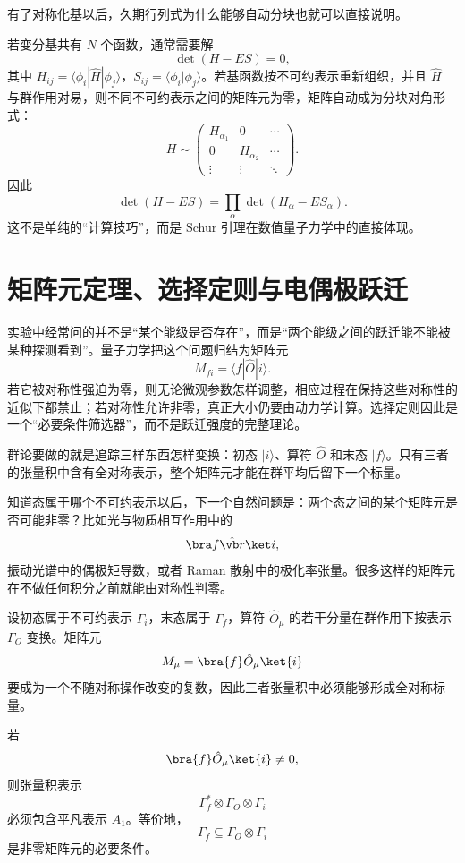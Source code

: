 有了对称化基以后，久期行列式为什么能够自动分块也就可以直接说明。

若变分基共有 $N$ 个函数，通常需要解
\[
\det(H-ES)=0,
\]
其中 $H_{ij}=\langle\phi_i|\hat H|\phi_j\rangle$，$S_{ij}=\langle\phi_i|\phi_j\rangle$。若基函数按不可约表示重新组织，并且 $\hat H$ 与群作用对易，则不同不可约表示之间的矩阵元为零，矩阵自动成为分块对角形式：
\[
H\sim
\begin{pmatrix}
H_{\alpha_1}&0&\cdots\\
0&H_{\alpha_2}&\cdots\\
\vdots&\vdots&\ddots
\end{pmatrix}.
\]
因此
\[
\det(H-ES)
=\prod_\alpha\det(H_\alpha-E S_\alpha).
\]
这不是单纯的“计算技巧”，而是 Schur 引理在数值量子力学中的直接体现。

\section{矩阵元定理、选择定则与电偶极跃迁}
\label{sec:selection-rules}

实验中经常问的并不是“某个能级是否存在”，而是“两个能级之间的跃迁能不能被某种探测看到”。量子力学把这个问题归结为矩阵元
\[
M_{fi}=\langle f|\hat O|i\rangle.
\]
若它被对称性强迫为零，则无论微观参数怎样调整，相应过程在保持这些对称性的近似下都禁止；若对称性允许非零，真正大小仍要由动力学计算。选择定则因此是一个“必要条件筛选器”，而不是跃迁强度的完整理论。

群论要做的就是追踪三样东西怎样变换：初态 $|i\rangle$、算符 $\hat O$ 和末态 $|f\rangle$。只有三者的张量积中含有全对称表示，整个矩阵元才能在群平均后留下一个标量。

知道态属于哪个不可约表示以后，下一个自然问题是：两个态之间的某个矩阵元是否可能非零？比如光与物质相互作用中的
\[
\bra f\hat{\vb r}\ket i,
\]
振动光谱中的偶极矩导数，或者 Raman 散射中的极化率张量。很多这样的矩阵元在不做任何积分之前就能由对称性判零。

设初态属于不可约表示 $\Gamma_i$，末态属于 $\Gamma_f$，算符 $\hat O_\mu$ 的若干分量在群作用下按表示 $\Gamma_O$ 变换。矩阵元
\[
M_\mu=\bra{f}\hat O_\mu\ket{i}
\]
要成为一个不随对称操作改变的复数，因此三者张量积中必须能够形成全对称标量。

\begin{theorem}[有限群矩阵元选择定则]
若
\[
\bra{f}\hat O_\mu\ket{i}\neq0,
\]
则张量积表示
\[
\Gamma_f^*\otimes\Gamma_O\otimes\Gamma_i
\]
必须包含平凡表示 $A_1$。等价地，
\[
\Gamma_f\subseteq\Gamma_O\otimes\Gamma_i
\]
是非零矩阵元的必要条件。
\label{thm:matrix-element-selection}

\end{theorem}


